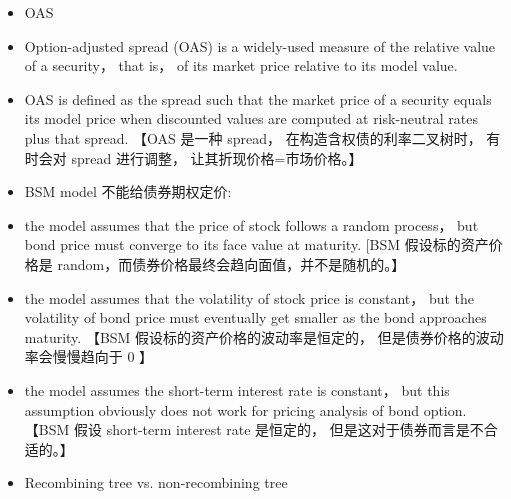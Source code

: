\begin{itemize}
\item OAS
\end{itemize}

\begin{itemize}
\item Option-adjusted spread (OAS) is a widely-used measure of the relative value of a security， that is， of its market price relative to its model value.
\end{itemize}

\begin{itemize}
\item OAS is defined as the spread such that the market price of a security equals its model price when discounted values are computed at risk-neutral rates plus that spread. 【OAS 是一种 spread， 在构造含权债的利率二叉树时， 有时会对 spread 进行调整， 让其折现价格=市场价格。】
\end{itemize}

\begin{itemize}
\item BSM model 不能给债券期权定价:
\end{itemize}

\begin{itemize}
\item the model assumes that the price of stock follows a random process， but bond price must converge to its face value at maturity. [BSM 假设标的资产价格是 random，而债券价格最终会趋向面值，并不是随机的。】
\end{itemize}

\begin{itemize}
\item the model assumes that the volatility of stock price is constant， but the volatility of bond price must eventually get smaller as the bond approaches maturity. 【BSM 假设标的资产价格的波动率是恒定的， 但是债券价格的波动率会慢慢趋向于 0 】
\end{itemize}

\begin{itemize}
\item the model assumes the short-term interest rate is constant， but this assumption obviously does not work for pricing analysis of bond option. 【BSM 假设 short-term interest rate 是恒定的， 但是这对于债券而言是不合适的。】
\end{itemize}

\begin{itemize}
\item Recombining tree vs. non-recombining tree
\end{itemize}

